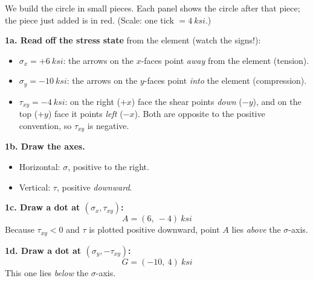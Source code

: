 \documentclass[11pt]{article}
\begin{document}
\noindent
We build the circle in small pieces. Each panel shows the circle after that piece; the piece
just added is in \textcolor{red!75!black}{red}. (Scale: one tick $= \SI{4}{ksi}$.)

\medskip
\noindent
\textbf{1a. Read off the stress state} from the element (watch the signs!):
\begin{itemize}
  \item $\sigma_x = +\SI{6}{ksi}$: the arrows on the $x$-faces point \emph{away} from the
        element (tension).
  \item $\sigma_y = -\SI{10}{ksi}$: the arrows on the $y$-faces point \emph{into} the
        element (compression).
  \item $\tau_{xy} = -\SI{4}{ksi}$: on the right ($+x$) face the shear points \emph{down}
        ($-y$), and on the top ($+y$) face it points \emph{left} ($-x$). Both are opposite
        to the positive convention, so $\tau_{xy}$ is negative.
\end{itemize}

\bigskip
\noindent
\begin{minipage}[c]{0.45\textwidth}
\textbf{1b. Draw the axes.}
\begin{itemize}
  \item Horizontal: $\sigma$, positive to the right.
  \item Vertical: $\tau$, positive \emph{downward}.
\end{itemize}
\end{minipage}%
\hfill
\begin{minipage}[c]{0.52\textwidth}
\centering{}
\end{minipage}

\bigskip
\noindent
\begin{minipage}[c]{0.45\textwidth}
\textbf{1c. Draw a dot at $(\sigma_x, \tau_{xy})$:}
\[ A = (6,\ -4)\ \si{ksi} \]
Because $\tau_{xy} < 0$ and $\tau$ is plotted positive downward, point $A$ lies
\emph{above} the $\sigma$-axis.
\end{minipage}%
\hfill
\begin{minipage}[c]{0.52\textwidth}
\centering{}
\end{minipage}

\bigskip
\noindent
\begin{minipage}[c]{0.45\textwidth}
\textbf{1d. Draw a dot at $(\sigma_y, -\tau_{xy})$:}
\[ G = (-10,\ 4)\ \si{ksi} \]
This one lies \emph{below} the $\sigma$-axis.
\end{minipage}%
\hfill
\begin{minipage}[c]{0.52\textwidth}
\centering{}
\end{minipage}
\end{document}
